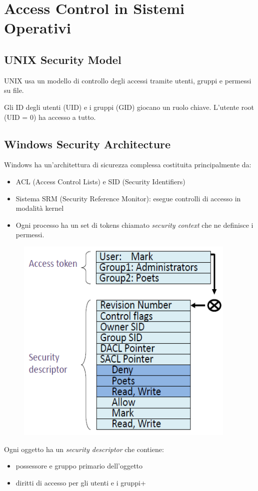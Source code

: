 \section{Access Control in Sistemi Operativi}

\subsection{UNIX Security Model}
UNIX usa un modello di controllo degli accessi tramite utenti, gruppi e permessi su file. 

Gli ID degli utenti (UID) e i gruppi (GID) giocano un ruolo chiave. L'utente root (UID = 0) ha accesso a tutto.

\subsection{Windows Security Architecture}
Windows ha un'architettura di sicurezza complessa costituita principalmente da:
\begin{itemize}
    \item ACL (Access Control Lists) e SID (Security Identifiers)
    \item Sistema SRM (Security Reference Monitor): esegue controlli di accesso in modalità kernel
    \item Ogni processo ha un set di tokens chiamato \textit{security context} che ne definisce i permessi.
\end{itemize}

\begin{figure}[ht]
    \centering
    \includegraphics[width=0.5\linewidth]{chapters/images2/security-descriptor.png}
\end{figure}

Ogni oggetto ha un \textit{security descriptor} che contiene:
\begin{itemize}
    \item possessore e gruppo primario dell'oggetto
    \item diritti di accesso per gli utenti e i gruppi+
\end{itemize}

